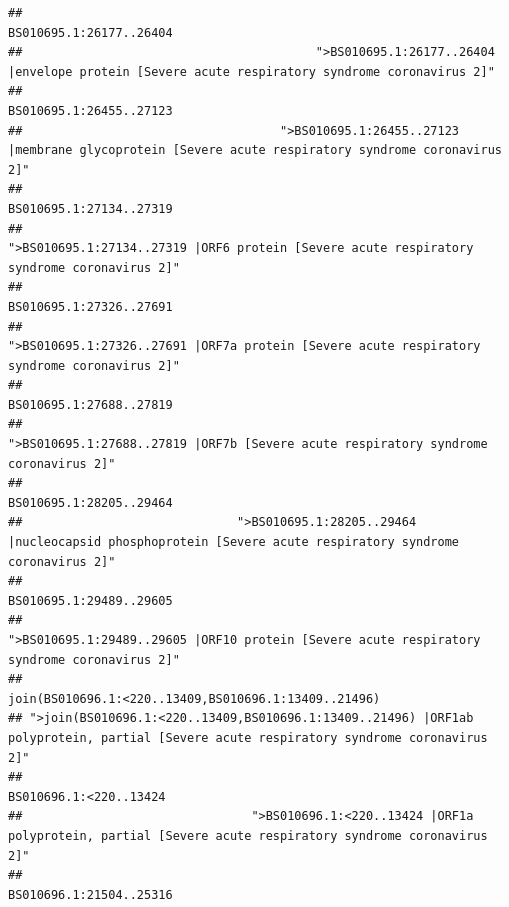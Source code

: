 \documentclass[
]{article}
\begin{document}
\begin{verbatim}
##                                                                                                                BS010695.1:26177..26404 
##                                         ">BS010695.1:26177..26404 |envelope protein [Severe acute respiratory syndrome coronavirus 2]" 
##                                                                                                                BS010695.1:26455..27123 
##                                    ">BS010695.1:26455..27123 |membrane glycoprotein [Severe acute respiratory syndrome coronavirus 2]" 
##                                                                                                                BS010695.1:27134..27319 
##                                             ">BS010695.1:27134..27319 |ORF6 protein [Severe acute respiratory syndrome coronavirus 2]" 
##                                                                                                                BS010695.1:27326..27691 
##                                            ">BS010695.1:27326..27691 |ORF7a protein [Severe acute respiratory syndrome coronavirus 2]" 
##                                                                                                                BS010695.1:27688..27819 
##                                                    ">BS010695.1:27688..27819 |ORF7b [Severe acute respiratory syndrome coronavirus 2]" 
##                                                                                                                BS010695.1:28205..29464 
##                              ">BS010695.1:28205..29464 |nucleocapsid phosphoprotein [Severe acute respiratory syndrome coronavirus 2]" 
##                                                                                                                BS010695.1:29489..29605 
##                                            ">BS010695.1:29489..29605 |ORF10 protein [Severe acute respiratory syndrome coronavirus 2]" 
##                                                                                   join(BS010696.1:<220..13409,BS010696.1:13409..21496) 
## ">join(BS010696.1:<220..13409,BS010696.1:13409..21496) |ORF1ab polyprotein, partial [Severe acute respiratory syndrome coronavirus 2]" 
##                                                                                                                 BS010696.1:<220..13424 
##                                ">BS010696.1:<220..13424 |ORF1a polyprotein, partial [Severe acute respiratory syndrome coronavirus 2]" 
##                                                                                                                BS010696.1:21504..25316 

\end{verbatim}
\end{document}

